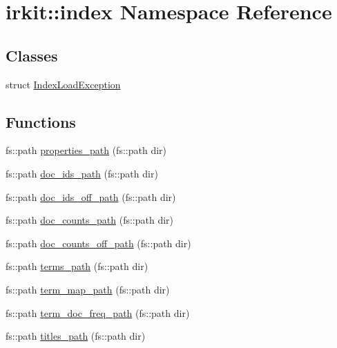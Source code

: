 \hypertarget{namespaceirkit_1_1index}{}\section{irkit\+:\+:index Namespace Reference}
\label{namespaceirkit_1_1index}
\subsection*{Classes}
\begin{DoxyCompactItemize}
\item 
struct \mbox{\hyperlink{structirkit_1_1index_1_1IndexLoadException}{Index\+Load\+Exception}}
\end{DoxyCompactItemize}
\subsection*{Functions}
\begin{DoxyCompactItemize}
\item 
fs\+::path \mbox{\hyperlink{namespaceirkit_1_1index_aadc3f8d2c43c068b8e8b1efb60370e8c}{properties\+\_\+path}} (fs\+::path dir)
\item 
fs\+::path \mbox{\hyperlink{namespaceirkit_1_1index_aab3491ded0cd4660b55f6c8f8c289428}{doc\+\_\+ids\+\_\+path}} (fs\+::path dir)
\item 
fs\+::path \mbox{\hyperlink{namespaceirkit_1_1index_a86d50e7aaf2bbdebf3e7a71623f4706e}{doc\+\_\+ids\+\_\+off\+\_\+path}} (fs\+::path dir)
\item 
fs\+::path \mbox{\hyperlink{namespaceirkit_1_1index_a5146ae382a6daf964681a09c55cdce93}{doc\+\_\+counts\+\_\+path}} (fs\+::path dir)
\item 
fs\+::path \mbox{\hyperlink{namespaceirkit_1_1index_a161f08dc57d21f41a9c03c7f97646e76}{doc\+\_\+counts\+\_\+off\+\_\+path}} (fs\+::path dir)
\item 
fs\+::path \mbox{\hyperlink{namespaceirkit_1_1index_ad05e7b96e9fec4cb7f93df6ea934c063}{terms\+\_\+path}} (fs\+::path dir)
\item 
fs\+::path \mbox{\hyperlink{namespaceirkit_1_1index_a027de2361c985399289f6528a69f7c80}{term\+\_\+map\+\_\+path}} (fs\+::path dir)
\item 
fs\+::path \mbox{\hyperlink{namespaceirkit_1_1index_a28db3dab0a7fd926c5a4e6a4d37755c3}{term\+\_\+doc\+\_\+freq\+\_\+path}} (fs\+::path dir)
\item 
fs\+::path \mbox{\hyperlink{namespaceirkit_1_1index_a556d5fca1ddd33b4c09cd470ad7f9861}{titles\+\_\+path}} (fs\+::path dir)
\end{DoxyCompactItemize}



